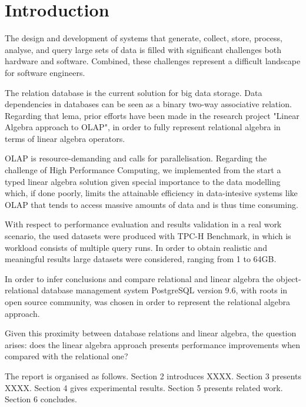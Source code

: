 
\section{Introduction}
\indent

The design and development of systems that generate, collect, store, process, analyse, and query large sets of data is filled with significant challenges both hardware and software. Combined, these challenges represent a difficult landscape for software engineers.\par 
The relation database is the current solution for big data storage.
Data dependencies in databases can be seen as a binary two-way associative relation. Regarding that lema, 
prior efforts have been made \cite{macedo2015linear} \cite{da2015benchmarking} in the research project "Linear Algebra approach to OLAP", in order to fully represent relational algebra in terms of linear algebra operators.
\par 
OLAP is resource-demanding and calls for parallelisation. Regarding the challenge of High Performance Computing, we implemented from the start a typed linear algebra solution given special importance to the data modelling which, if done poorly, limits the attainable efficiency in data-intesive systems like OLAP that tends to access massive amounts of data and is thus time consuming. \par 
With respect to performance evaluation and results validation in a real work scenario, the used datasets were produced with TPC-H Benchmark, in which is workload consists of multiple query runs.
In order to obtain realistic and meaningful results large datasets were considered, ranging from 1 to 64GB.\par 
In order to infer conclusions and compare relational and linear algebra the object-relational database management system PostgreSQL version 9.6, with roots in open source community, was chosen in order to represent the relational algebra approach. \par 
Given this proximity between database relations and linear algebra, the question arises: does the linear algebra approach presents performance improvements when compared with the relational one?\par 
The report is organised as follows. Section 2 introduces XXXX. Section 3 presents XXXX. Section 4 gives experimental results. Section 5 presents related work. Section 6 concludes.